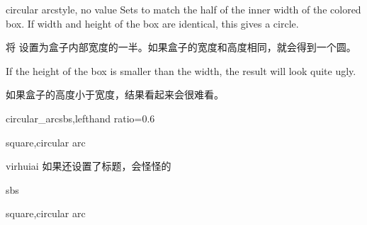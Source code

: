 



\begin{docTcbKey}[][doc new=2015-05-05]{circular arc}{}{style, no value}
  Sets  to match the half of the inner width of the colored box.
  If width and height of the box are identical, this gives a circle.
  
  将  设置为盒子内部宽度的一半。如果盒子的宽度和高度相同，就会得到一个圆。
  \begin{marker}
  If the height of the box is smaller than the width, the result will look
  quite ugly.
  
  如果盒子的高度小于宽度，结果看起来会很难看。   
  \end{marker}
  \begin{exdispExample*}{circular_arc}{sbs,lefthand ratio=0.6}
  \begin{tcolorbox}[width=3cm,
  colback=red!5!white,
  colframe=red!75!black,
  halign=center,valign=center,
  square,circular arc]
  square,circular arc
  \end{tcolorbox}
  \end{exdispExample*}

\begin{引述之言}{virhuiai}
如果还设置了标题，会怪怪的
\end{引述之言}
\begin{dispExample*}{sbs}
\begin{tcolorbox}[width=3cm,
colback=red!5!white,
colframe=red!75!black,
halign=center,valign=center,
square,circular arc
,title=test]
square,circular arc
\end{tcolorbox}
\end{dispExample*}
\end{docTcbKey}


  
